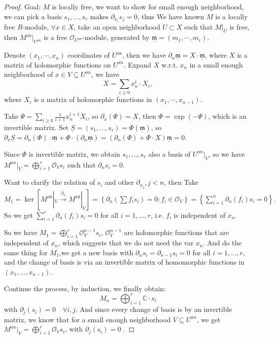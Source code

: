\documentclass[openany]{book}
\theoremstyle{definition} %
\theoremstyle{remark}
\begin{document}
\begin{proof}
    \quad

    Goal: $M$ is locally free, we want to show for small enough neighborhood, we can pick a basis $s_{1},\dots,s_{r}$ makes $\partial_{x_{i}}s_{j}=0$, thus
    We have known $M$ is a locally free $R$-module, $\forall x \in X$, take an open neighborhood $U \subset X$ such that $M|_U$ is free, then $M^{\text{an}}|_{U^{\text{an}}}$ is a free $\mathcal{O}_{U^{\text{an}}}$-module, generated by $\underline{\mathfrak{m}} = (m_1, \cdots, m_r)$.

    Denote $(x_1, \cdots, x_n)$ coordinates of $U^{\text{an}}$, then we have $\partial_{n} \underline{\mathfrak{m}} = X \cdot\underline{ \mathfrak{m}}$, where $X$ is a matrix of holomorphic functions on $U^{an}$. Expand $X$ w.r.t. $x_n$ in a small enough neighborhood of $x\in V\subseteq U^{an}$, we have $$X = \sum_{i\ge0} x_n^i \cdot X_i,$$where $X_i$ is a matrix of holomorphic functions in $(x_1, \cdots, x_{n-1})$.

    Take $\Psi=\sum\limits_{i\ge 0} \frac{1}{i+1} x_{n}^{i+1}X_{i}$, so $\partial_{x}(\Psi)=X$, then $\Phi=\mathrm{\exp}(-\Psi)$, which is an invertible matrix. Set $\underline{S}=(s_{1},\dots,s_{r})=\Phi(\underline{\mathfrak{m}})$, so $\partial_{x}\underline{S}=\partial_{n}(\Phi)\cdot \underline{\mathfrak{m}}+\Phi \cdot(\partial_{n} \underline{\mathfrak{m}})=(\partial_{n}(\Phi)+\Phi \cdot X)\underline{\mathfrak{m}}=0$.

    Since $\Phi$ is invertible matrix, we obtain $s_{1},\dots,s_{r}$ also a basis of $U^{an}|_{V}$, so we have $M^{an}|_{V}=\bigoplus\limits_{i=1}^{r}\mathcal{O}_{V}s_{i}$ such that $\partial_{n}s_{i}=0$.

    Want to clarify the relation of $s_{i}$ and other $\partial_{x_{j}},j<n$, then Take $M_1 = \ker[M^{\text{an}}|_V \xrightarrow{\partial_n} M^{\text{an}}|_V]=\left\{ \partial_{n}\left( \sum f_{i}s_{i} \right)=0:f_{i}\in \mathcal{O}_{V} \right\}=\left\{ \sum\limits_{i=1}^{n}\partial_{n}(f_{i})s_{i}=0 \right\}.$ So we get $\sum_{i=1}^r \partial_n(f_i) s_i = 0$ for all $i=1,\dots,r$, i.e. $f_{i}$ is independent of $x_{n}$.

    So we have $M_{1}=\bigoplus\limits_{i=1}^{r}\mathcal{O}_{V}^{n-1}s_{i}$, $\mathcal{O}_{V}^{n-1}$ are holomorphic functions that are independent of $x_{n}$, which suggests that we do not need the var $x_{n}$. And do the same thing for $M_{1}$,we get a new basis with $\partial_{n}s_{i}=\partial_{n-1}s_{i}=0$ for all $i=1,\dots,r$, and the change of basis is via an invertible matrix of homomorphic functions in $(x_{1},\dots,x_{n-1})$.

    Continue the process, by induction, we finally obtain:  $$ M_n = \bigoplus_{i=1}^r \mathbb{C} \cdot s_i $$with $\partial_j(s_i) = 0 \quad \forall i, j$. And since every change of basis is by an invertible matrix, we know that for a small enough neighborhood $V \subseteq U^{an}$, we get $M^{an}|_{V}=\bigoplus\limits_{i=1}^{r}\mathcal{O}_{V}s_{i}$, with $\partial_{j}(s_{i})=0$ .
\end{proof}
\end{document}
